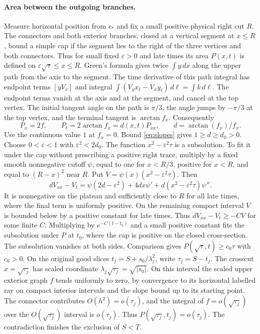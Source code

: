\paragraph{Area between the outgoing branches.}
Measure horizontal position from \(c_*\) and fix a small positive
physical right cut \(R\). The connectors and both exterior branches,
closed at a vertical segment at \(x\le R\), bound a simple cap if
the segment lies to the right of the three vertices and both connectors. Thus for small fixed
\(\varepsilon>0\) and late times its area \(P(x,t)\) is defined on
\(\varepsilon\sqrt{\tau}\le x\le R\). Green's formula gives twice
\(\int y\,d x\) along the upper path from the axis to the segment.
The time derivative of this path integral has endpoint terms
\([y V_x]\) and integral \(\int (V_y x_\ell-V_x y_\ell)\,d\ell
=\int k\,d\ell\).
The endpoint terms vanish at the axis and at the segment, and
cancel at the top vertex. The initial tangent angle on the path
is \(\pi/3\), the angle jumps by \(-\pi/3\) at the top vertex, and
the terminal tangent is \(\arctan f_x\). Consequently
\[
 P_x=2f,\qquad P_t=2\arctan f_x=d(x,t)P_{xx},\qquad
 d=\arctan(f_x)/f_x .
\]
Use the continuous value \(1\) at \(f_x=0\). Bound \eqref{eq:slopes}
gives \(1\ge d\ge d_0>0\). Choose \(0<\varepsilon<1\) with
\(\varepsilon^2<2d_0\). The function \(x^2-\varepsilon^2\tau\)
is a subsolution. To fit it under the cap without prescribing a
positive right trace, multiply by a fixed smooth nonnegative cutoff
\(\psi\), equal to one for \(x<R/3\), positive for \(x<R\), and equal
to \((R-x)^2\) near \(R\). Put \(V=\psi(x)(x^2-\varepsilon^2\tau)\).
Then
\[
 dV_{xx}-V_t=\psi(2d-\varepsilon^2)
              +4dx\psi'+d(x^2-\varepsilon^2\tau)\psi'' .
\]
It is nonnegative on the plateau and sufficiently close to \(R\)
for all late times, where the final term is uniformly positive.
On the remaining compact interval \(V\) is bounded below by a positive
constant for late times. Thus \(dV_{xx}-V_t\ge -CV\) for some finite \(C\).
Multiplying by \(e^{-C(t-t_0)}\) and a small positive constant fits
the subsolution under \(P\) at \(t_0\), where the cap is positive
on the closed cross-section. The subsolution vanishes at both sides.
Comparison gives \(P(\sqrt{\tau},t)\ge c_0\tau\) with \(c_0>0\).
On the original good slices \(t_j=S+s_0/\lambda_j^2\), write
\(\tau_j=S-t_j\). The crosscut \(x=\sqrt{\tau_j}\) has scaled
coordinate \(\lambda_j\sqrt{\tau_j}=\sqrt{|s_0|}\). On this
interval the scaled upper exterior graph \(f\) tends uniformly
to zero, by convergence to its horizontal labelled ray on compact
interior intervals and the slope bound up to its starting point.
The connector contributes \(O(h^2)=o(\tau_j)\), and the integral of
\(f=o(\sqrt{\tau_j})\) over the \(O(\sqrt{\tau_j})\) interval is
\(o(\tau_j)\). Thus \(P(\sqrt{\tau_j},t_j)=o(\tau_j)\). The contradiction
finishes the exclusion of \(S<T\).

